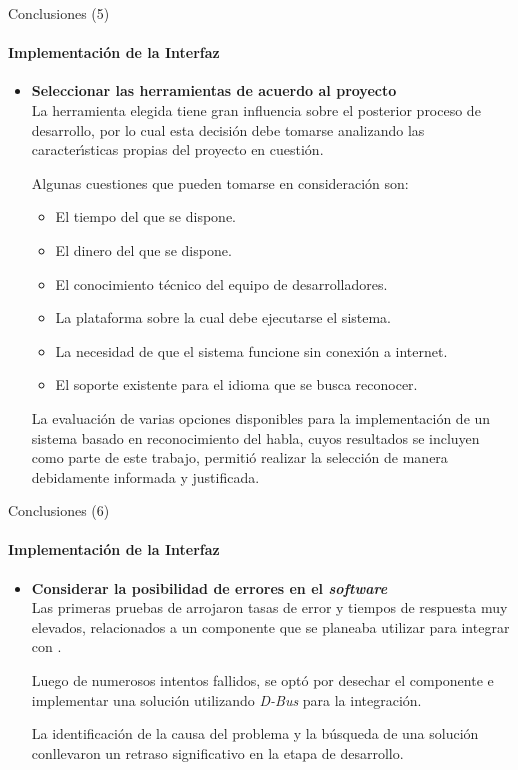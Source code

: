 \begin{frame}{Conclusiones (5)}
\framesubtitle{Implementaci\'on de la Interfaz}
\begin{itemize}

\item{\textbf{Seleccionar las herramientas de acuerdo al \mbox{proyecto}\\}}
La herramienta elegida tiene gran influencia sobre el posterior proceso de
desarrollo, por lo cual esta decisi\'on debe tomarse analizando las caracter{\'\i}sticas
propias del proyecto en cuesti\'on.

Algunas cuestiones que pueden tomarse en consideraci\'on son:

\begin{itemize}
    \item El tiempo del que se dispone.
    \item El dinero del que se dispone.
    \item El conocimiento t\'ecnico del equipo de desarrolladores.
    \item La plataforma sobre la cual debe ejecutarse el sistema.
    \item La necesidad de que el sistema funcione sin conexi\'on a internet.
    \item El soporte existente para el idioma que se busca reconocer.
\end{itemize}

La evaluaci\'on de varias opciones disponibles para la implementaci\'on de un sistema
basado en reconocimiento del habla, cuyos resultados se incluyen como parte de este
trabajo, permiti\'o realizar la selecci\'on de manera debidamente informada y justificada.

\end{itemize}
\end{frame}


\begin{frame}{Conclusiones (6)}
\framesubtitle{Implementaci\'on de la Interfaz}
\begin{itemize}

\item{\textbf{Considerar la posibilidad de errores en el \emph{software}\\}}
Las primeras pruebas de  arrojaron tasas de error y tiempos de
respuesta muy elevados, relacionados a un componente que se planeaba utilizar
para integrar  con .

Luego de numerosos intentos fallidos, se opt\'o por desechar el componente e implementar una soluci\'on 
utilizando \emph{D-Bus} para la integraci\'on. 

La identificaci\'on de la causa del problema y la
b\'usqueda de una soluci\'on conllevaron un retraso significativo en la etapa de desarrollo.

\end{itemize}
\end{frame}

